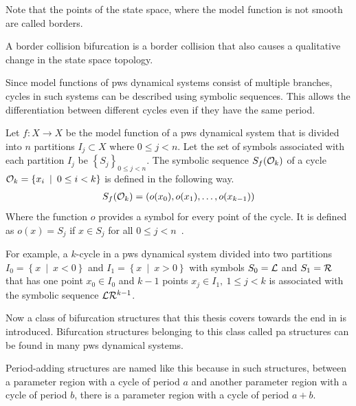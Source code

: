 Note that the points of the state space, where the model function is not smooth are called borders.

\begin{definition}
	A border collision bifurcation is a border collision that also causes a qualitative change in the state space topology.
\end{definition}

Since model functions of \gls{pws} dynamical systems consist of multiple branches, cycles in such systems can be described using symbolic sequences.
This allows the differentiation between different cycles even if they have the same period.

\begin{definition}
	Let $f: X \to X$ be the model function of a \gls{pws} dynamical system that is divided into $n$ partitions $I_j \subset X$ where $0 \leq j < n$.
	Let the set of symbols associated with each partition $I_j$ be $\left\{S_j\right\}_{0 \leq j < n}$.
	The symbolic sequence $S_f(\mathcal{O}_k)$ of a cycle $\mathcal{O}_k = \left\{x_i \:\mid\: 0 \leq i < k\right\}$ is defined in the following way.
	\begin{align}
		S_f(\mathcal{O}_k) = \left(o(x_0), o(x_1), \dots, o(x_{k-1})\right)
	\end{align}
	Where the function $o$ provides a symbol for every point of the cycle.
	It is defined as $o(x) = S_j$ if $x \in S_j$ for all $0 \leq j < n$~\cite{granados14adding}.
\end{definition}

For example, a $k$-cycle in a \gls{pws} dynamical system divided into two partitions $I_0 = \left\{x \:\mid\: x < 0\right\}$ and $I_1 = \left\{x \:\mid\: x > 0\right\}$ with symbols $S_0 = \mathcal{L}$ and $S_1 = \mathcal{R}$ that has one point $x_0 \in I_0$ and $k-1$ points $x_j \in I_1, \:1 \leq j < k$ is associated with the symbolic sequence $\mathcal{L}\mathcal{R}^{k-1}$.

Now a class of bifurcation structures that this thesis covers towards the end in  is introduced.
Bifurcation structures belonging to this class called \gls{pa} structures can be found in many \gls{pws} dynamical systems.

Period-adding structures are named like this because in such structures, between a parameter region with a cycle of period $a$ and another parameter region with a cycle of period $b$, there is a parameter region with a cycle of period $a + b$.

